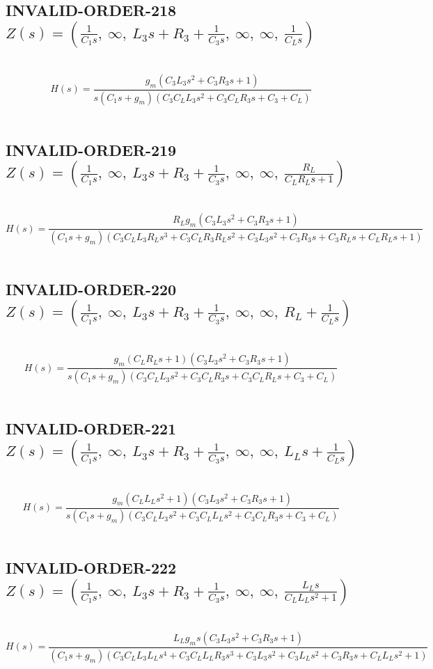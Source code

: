 \documentclass{article}
\begin{document}
\subsection{INVALID-ORDER-218 $Z(s) = \left( \frac{1}{C_{1} s}, \  \infty, \  L_{3} s + R_{3} + \frac{1}{C_{3} s}, \  \infty, \  \infty, \  \frac{1}{C_{L} s}\right)$ } \ 
\textbf{\[H(s) = \frac{g_{m} \left(C_{3} L_{3} s^{2} + C_{3} R_{3} s + 1\right)}{s \left(C_{1} s + g_{m}\right) \left(C_{3} C_{L} L_{3} s^{2} + C_{3} C_{L} R_{3} s + C_{3} + C_{L}\right)}\] } \ 
\subsection{INVALID-ORDER-219 $Z(s) = \left( \frac{1}{C_{1} s}, \  \infty, \  L_{3} s + R_{3} + \frac{1}{C_{3} s}, \  \infty, \  \infty, \  \frac{R_{L}}{C_{L} R_{L} s + 1}\right)$ } \ 
\textbf{\[H(s) = \frac{R_{L} g_{m} \left(C_{3} L_{3} s^{2} + C_{3} R_{3} s + 1\right)}{\left(C_{1} s + g_{m}\right) \left(C_{3} C_{L} L_{3} R_{L} s^{3} + C_{3} C_{L} R_{3} R_{L} s^{2} + C_{3} L_{3} s^{2} + C_{3} R_{3} s + C_{3} R_{L} s + C_{L} R_{L} s + 1\right)}\] } \ 
\subsection{INVALID-ORDER-220 $Z(s) = \left( \frac{1}{C_{1} s}, \  \infty, \  L_{3} s + R_{3} + \frac{1}{C_{3} s}, \  \infty, \  \infty, \  R_{L} + \frac{1}{C_{L} s}\right)$ } \ 
\textbf{\[H(s) = \frac{g_{m} \left(C_{L} R_{L} s + 1\right) \left(C_{3} L_{3} s^{2} + C_{3} R_{3} s + 1\right)}{s \left(C_{1} s + g_{m}\right) \left(C_{3} C_{L} L_{3} s^{2} + C_{3} C_{L} R_{3} s + C_{3} C_{L} R_{L} s + C_{3} + C_{L}\right)}\] } \ 
\subsection{INVALID-ORDER-221 $Z(s) = \left( \frac{1}{C_{1} s}, \  \infty, \  L_{3} s + R_{3} + \frac{1}{C_{3} s}, \  \infty, \  \infty, \  L_{L} s + \frac{1}{C_{L} s}\right)$ } \ 
\textbf{\[H(s) = \frac{g_{m} \left(C_{L} L_{L} s^{2} + 1\right) \left(C_{3} L_{3} s^{2} + C_{3} R_{3} s + 1\right)}{s \left(C_{1} s + g_{m}\right) \left(C_{3} C_{L} L_{3} s^{2} + C_{3} C_{L} L_{L} s^{2} + C_{3} C_{L} R_{3} s + C_{3} + C_{L}\right)}\] } \ 
\subsection{INVALID-ORDER-222 $Z(s) = \left( \frac{1}{C_{1} s}, \  \infty, \  L_{3} s + R_{3} + \frac{1}{C_{3} s}, \  \infty, \  \infty, \  \frac{L_{L} s}{C_{L} L_{L} s^{2} + 1}\right)$ } \ 
\textbf{\[H(s) = \frac{L_{L} g_{m} s \left(C_{3} L_{3} s^{2} + C_{3} R_{3} s + 1\right)}{\left(C_{1} s + g_{m}\right) \left(C_{3} C_{L} L_{3} L_{L} s^{4} + C_{3} C_{L} L_{L} R_{3} s^{3} + C_{3} L_{3} s^{2} + C_{3} L_{L} s^{2} + C_{3} R_{3} s + C_{L} L_{L} s^{2} + 1\right)}\] } \ 
\end{document}
